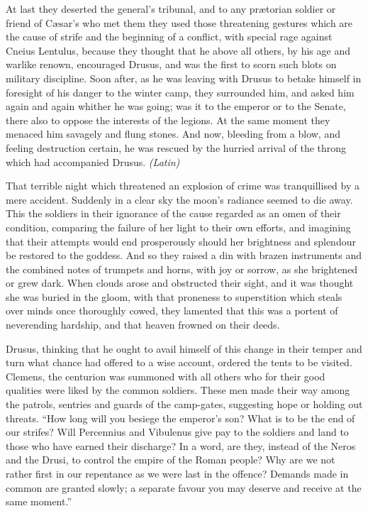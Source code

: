 At last they deserted the general's tribunal, and to any prætorian soldier or friend of Cæsar's who met them they used those threatening gestures which are the cause of strife and the beginning of a conflict, with special rage against Cneius Lentulus, because they thought that he above all others, by his age and warlike renown, encouraged Drusus, and was the first to scorn such blots on military discipline. Soon after, as he was leaving with Drusus to betake himself in foresight of his danger to the winter camp, they surrounded him, and asked him again and again whither he was going; was it to the emperor or to the Senate, there also to oppose the interests of the legions. At the same moment they menaced him savagely and flung stones. And now, bleeding from a blow, and feeling destruction certain, he was rescued by the hurried arrival of the throng which had accompanied Drusus. \emph{(Latin)}


That terrible night which threatened an explosion of crime was tranquillised by a mere accident. Suddenly in a clear sky the moon's radiance seemed to die away. This the soldiers in their ignorance of the cause regarded as an omen of their condition, comparing the failure of her light to their own efforts, and imagining that their attempts would end prosperously should her brightness and splendour be restored to the goddess. And so they raised a din with brazen instruments and the combined notes of trumpets and horns, with joy or sorrow, as she brightened or grew dark. When clouds arose and obstructed their sight, and it was thought she was buried in the gloom, with that proneness to superstition which steals over minds once thoroughly cowed, they lamented that this was a portent of neverending hardship, and that heaven frowned on their deeds.

Drusus, thinking that he ought to avail himself of this change in their temper and turn what chance had offered to a wise account, ordered the tents to be visited. Clemens, the centurion was summoned with all others who for their good qualities were liked by the common soldiers. These men made their way among the patrols, sentries and guards of the camp-gates, suggesting hope or holding out threats. ``How long will you besiege the emperor's son? What is to be the end of our strifes? Will Percennius and Vibulenus give pay to the soldiers and land to those who have earned their discharge? In a word, are they, instead of the Neros and the Drusi, to control the empire of the Roman people? Why are we not rather first in our repentance as we were last in the offence? Demands made in common are granted slowly; a separate favour you may deserve and receive at the same moment.''

